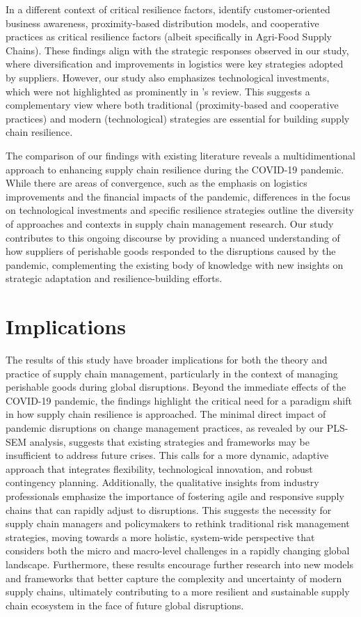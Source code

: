 In a different context of critical resilience factors, \textcite{Montanya2023ThePandemic} identify customer-oriented business awareness, proximity-based distribution models, and cooperative practices as critical resilience factors (albeit specifically in Agri-Food Supply Chains). These findings align with the strategic responses observed in our study, where diversification and improvements in logistics were key strategies adopted by suppliers. However, our study also emphasizes technological investments, which were not highlighted as prominently in \textcite{Montanya2023ThePandemic}'s review. This suggests a complementary view where both traditional (proximity-based and cooperative practices) and modern (technological) strategies are essential for building supply chain resilience.

The comparison of our findings with existing literature reveals a multidimentional approach to enhancing supply chain resilience during the COVID-19 pandemic. While there are areas of convergence, such as the emphasis on logistics improvements and the financial impacts of the pandemic, differences in the focus on technological investments and specific resilience strategies outline the diversity of approaches and contexts in supply chain management research. Our study contributes to this ongoing discourse by providing a nuanced understanding of how suppliers of perishable goods responded to the disruptions caused by the pandemic, complementing the existing body of knowledge with new insights on strategic adaptation and resilience-building efforts.

\section{Implications}

The results of this study have broader implications for both the theory and practice of supply chain management, particularly in the context of managing perishable goods during global disruptions. Beyond the immediate effects of the COVID-19 pandemic, the findings highlight the critical need for a paradigm shift in how supply chain resilience is approached. The minimal direct impact of pandemic disruptions on change management practices, as revealed by our PLS-SEM analysis, suggests that existing strategies and frameworks may be insufficient to address future crises. This calls for a more dynamic, adaptive approach that integrates flexibility, technological innovation, and robust contingency planning. Additionally, the qualitative insights from industry professionals emphasize the importance of fostering agile and responsive supply chains that can rapidly adjust to disruptions. This suggests the necessity for supply chain managers and policymakers to rethink traditional risk management strategies, moving towards a more holistic, system-wide perspective that considers both the micro and macro-level challenges in a rapidly changing global landscape. Furthermore, these results encourage further research into new models and frameworks that better capture the complexity and uncertainty of modern supply chains, ultimately contributing to a more resilient and sustainable supply chain ecosystem in the face of future global disruptions.